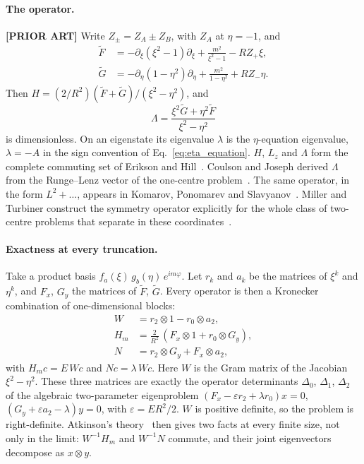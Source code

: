\documentclass[aps,pra,twocolumn,superscriptaddress,longbibliography]{revtex4-2}
\begin{document}
\paragraph{The operator.}
\textbf{[PRIOR ART]} Write $Z_\pm = Z_A \pm Z_B$, with $Z_A$ at
$\eta = -1$, and
\begin{align}
  \tilde F &= -\partial_\xi(\xi^2-1)\partial_\xi + \frac{m^2}{\xi^2-1}
              - R Z_+ \xi, \nonumber\\
  \tilde G &= -\partial_\eta(1-\eta^2)\partial_\eta + \frac{m^2}{1-\eta^2}
              + R Z_- \eta. \label{eq:FG_tilde}
\end{align}
Then $H = (2/R^2)(\tilde F + \tilde G)/(\xi^2-\eta^2)$, and
\begin{equation}
  \Lambda = \frac{\xi^2 \tilde G + \eta^2 \tilde F}{\xi^2 - \eta^2}
  \label{eq:Lambda_op}
\end{equation}
is dimensionless. On an eigenstate its eigenvalue $\lambda$ is the
$\eta$-equation eigenvalue, $\lambda = -A$ in the sign convention of
Eq.~\eqref{eq:eta_equation}. $H$, $L_z$ and $\Lambda$ form the complete
commuting set of Erikson and Hill~\cite{EriksonHill1949}. Coulson and
Joseph derived $\Lambda$ from the Runge--Lenz vector of the one-centre
problem~\cite{CoulsonJoseph1967}. The same operator, in the form
$L^2 + \ldots$, appears in Komarov, Ponomarev and
Slavyanov~\cite{KPS1976}. Miller and Turbiner construct the symmetry
operator explicitly for the whole class of two-centre problems that
separate in these coordinates~\cite{MillerTurbiner2014}.

\paragraph{Exactness at every truncation.}
Take a product basis $f_a(\xi)\,g_b(\eta)\,e^{im\varphi}$. Let $r_k$ and
$a_k$ be the matrices of $\xi^k$ and $\eta^k$, and $F_x$, $G_y$ the
matrices of $\tilde F$, $\tilde G$. Every operator is then a Kronecker
combination of one-dimensional blocks:
\begin{align}
  W   &= r_2\otimes 1 - r_0\otimes a_2, \nonumber\\
  H_m &= \tfrac{2}{R^2}\,(F_x\otimes 1 + r_0\otimes G_y), \nonumber\\
  N   &= r_2\otimes G_y + F_x\otimes a_2, \label{eq:atkinson_dets}
\end{align}
with $H_m c = E\,W c$ and $N c = \lambda\,W c$. Here $W$ is the Gram
matrix of the Jacobian $\xi^2-\eta^2$. These three matrices are exactly
the operator determinants $\Delta_0$, $\Delta_1$, $\Delta_2$ of the
algebraic two-parameter eigenproblem
$(F_x - \varepsilon r_2 + \lambda r_0)x = 0$,
$(G_y + \varepsilon a_2 - \lambda)y = 0$, with
$\varepsilon = E R^2/2$. $W$ is positive definite, so the problem is
right-definite. Atkinson's theory~\cite{Atkinson1972} then gives two
facts at every finite size, not only in the limit:
$W^{-1}H_m$ and $W^{-1}N$ commute, and their joint eigenvectors
decompose as $x\otimes y$.
\end{document}

